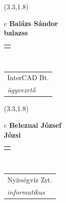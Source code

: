 \documentclass[11pt]{article}
\begin{document}
\makebox(3.3,1.8){
  \renewcommand\arraystretch{1.3}
  \begin{tabular}[c]{c}
    \hspace{8.5mm}
    \LARGE\bf{ Balázs Sándor }\\
    \hspace{8.5mm}
    \Large{ balazss }\\
    \renewcommand\arraystretch{3}
    \begin{tabular}[c]{c}
      \centering
      \fontfamily{phv}\selectfont{
        \textbf{
          \textsc{
            \scriptsize{
            \color{Bright}{ Ismerkedő }\color{Dark}{ Webmester }\color{Bright}{ Sminkmester }\color{Bright}{ Programozó }
            }
          }
        }
      }
    \end{tabular}
    \\
    \renewcommand\arraystretch{1}
    \begin{tabular}{p{3.3in}}
      \hspace{.7cm}InterCAD Bt.\\
      \hspace{.7cm}\emph{ ügyvezető }\\
    \end{tabular}
  \end{tabular}
}

\makebox(3.3,1.8){
  \renewcommand\arraystretch{1.3}
  \begin{tabular}[c]{c}
    \hspace{8.5mm}
    \LARGE\bf{ Beleznai József }\\
    \hspace{8.5mm}
    \Large{ Józsi }\\
    \renewcommand\arraystretch{3}
    \begin{tabular}[c]{c}
      \centering
      \fontfamily{phv}\selectfont{
        \textbf{
          \textsc{
            \scriptsize{
            \color{Dark}{ Ismerkedő }\color{Bright}{ Webmester }\color{Bright}{ Sminkmester }\color{Bright}{ Programozó }
            }
          }
        }
      }
    \end{tabular}
    \\
    \renewcommand\arraystretch{1}
    \begin{tabular}{p{3.3in}}
      \hspace{.7cm}Nyírségvíz Zrt.\\
      \hspace{.7cm}\emph{ informatikus }\\
    \end{tabular}
  \end{tabular}
}
\end{document}
